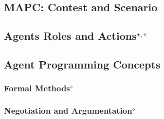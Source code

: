 \subsection{MAPC: Contest and Scenario}


\subsection[Agent Roles and Actions]{Agents Roles and Actions$^{\star,\circ}$}\label{fun:mapc_roles}


\subsection{Agent Programming Concepts}



\subsubsection[Formal Methods]{Formal Methods$^\diamond$}\label{fun:formal_methods}


\subsubsection[Negotiation and Argumentation]{Negotiation and Argumentation$^\diamond$}\label{fun:negotiation}


